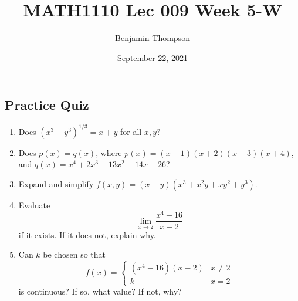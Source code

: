 \documentclass[12pt,a4paper]{article}
\title{MATH1110 Lec 009 Week 5-W}
\author{Benjamin Thompson}
\date{September 22, 2021}
\newcommand{\vspaceC}{\vspace{3cm}}
\begin{document}
\subsection*{Practice Quiz}
\begin{enumerate}
    \item Does $(x^3 + y^3)^{1/3} = x + y$ for all $x,y$?
    \vspaceC
    \item Does $p(x) = q(x)$, where $p(x) = (x-1)(x+2)(x-3)(x+4)$, and $q(x) = x^4 + 2 x^3 - 13 x^2 - 14 x + 26$?
    \vspaceC
    \item Expand and simplify $f(x,y) = (x - y)(x^3 + x^2y + xy^2 + y^3)$.
    \vspaceC
    \item Evaluate
    \[
        \lim_{x \rightarrow 2} \frac{x^4 - 16}{x-2}
    \]
    if it exists. If it does not, explain why.
    \vspaceC
    \item Can $k$ be chosen so that
    \[
    f(x) = \begin{cases}
        (x^4 - 16)(x-2) & x \ne 2 \\
        k               & x = 2
    \end{cases}
    \]
    is continuous? If so, what value? If not, why?
\end{enumerate}
\end{document}
